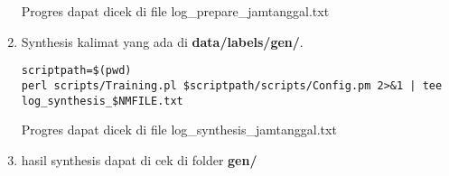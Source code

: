 \documentclass[12pt,]{article}
\begin{document}
\begin{enumerate}
		Progres dapat dicek di file log\_prepare\_jamtanggal.txt
		
		\item Synthesis kalimat yang ada di \textbf{data/labels/gen/}.
		\begin{verbatim}
scriptpath=$(pwd)
perl scripts/Training.pl $scriptpath/scripts/Config.pm 2>&1 | tee log_synthesis_$NMFILE.txt
		\end{verbatim}
		
		Progres dapat dicek di file log\_synthesis\_jamtanggal.txt
		
		\item hasil synthesis dapat di cek di folder \textbf{gen/}
		
	\end{enumerate}
	
	
	
\end{document}
